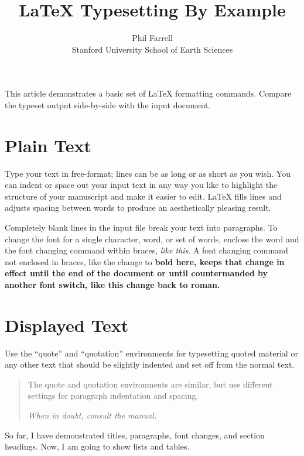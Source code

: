 \documentclass[12pt]{article}
\theoremstyle{definition}
\begin{document}
\title{LaTeX Typesetting By Example}
\author{Phil Farrell\\
Stanford University School of Earth Sciences}
\renewcommand{\today}{November 2, 1994}
\maketitle
This article demonstrates a basic set of LaTeX formatting commands.
Compare the typeset output side-by-side with the input document.

\section {Plain Text}
Type your text in free-format; lines can be as long
or as short
as you wish.
      You can indent      or space out
        your input 
          text in 
            any way you like to highlight the structure
      of your manuscript and make it easier to edit.
LaTeX fills lines and adjusts spacing between words to produce an
aesthetically pleasing result.

Completely blank lines in the input file break your text into
paragraphs.
To change the font for a single character, word, or set of words, 
enclose the word and the font changing command within braces, 
{\em like this}.
A font changing command not enclosed in braces, like the change to \bf 
bold here, keeps that change in effect until the end of the document or
until countermanded by another font switch, like this change back to 
\rm roman.
\section {Displayed Text}
Use the ``quote'' and ``quotation'' environments for typesetting quoted
material or any other text that should be slightly indented and set off
from the normal text.
\begin{quotation}
The quote and quotation environments are similar, but use different 
settings for paragraph indentation and spacing.

\em When in doubt, consult the manual.
\end{quotation}

So far, I have demonstrated titles, paragraphs, font changes, and
section headings.
Now, I am going to show lists and tables.
\end{document}
